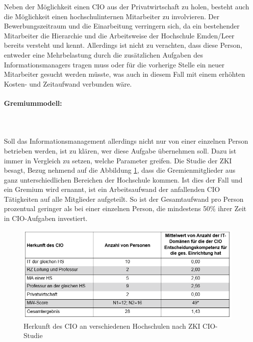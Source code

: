 Neben der Möglichkeit einen CIO aus der Privatwirtschaft zu holen, besteht auch die Möglichkeit einen hochschulinternen Mitarbeiter zu involvieren. Der Bewerbungszeitraum und die Einarbeitung verringern sich, da ein bestehender Mitarbeiter die Hierarchie und die Arbeitsweise der Hochschule Emden/Leer bereits versteht und kennt. Allerdings ist nicht zu verachten, dass diese Person, entweder eine Mehrbelastung durch die zusätzlichen Aufgaben des Informationsmanagers tragen muss oder für die vorherige Stelle ein neuer Mitarbeiter gesucht werden müsste, was auch in diesem Fall mit einem erhöhten Kosten- und Zeitaufwand verbunden wäre.
\newpage
\paragraph*{Gremiummodell:}\mbox{}\\\\
Soll das Informationsmanagement allerdings nicht nur von einer einzelnen Person betrieben werden, ist zu klären, wer diese Aufgabe übernehmen soll. Dazu ist immer in Vergleich zu setzen, welche Parameter greifen. Die Studie der ZKI besagt, Bezug nehmend auf die Abbildung \ref{fig_herkunft_cio_hochschulen}, dass die Gremienmitglieder aus ganz unterschiedlichen Bereichen der Hochschule kommen. Ist dies der Fall und ein Gremium wird ernannt, ist ein Arbeitsaufwand der anfallenden CIO Tätigkeiten auf alle Mitglieder aufgeteilt. So ist der Gesamtaufwand pro Person prozentual geringer als bei einer einzelnen Person, die mindestens 50\% ihrer Zeit in CIO-Aufgaben investiert.

\begin{figure}[h!]
	\centering
	\includegraphics[width=\textwidth]
	{kapitel/gruppe3/bilder/herkunft_cio_hochschulen}
	\caption{Herkunft des CIO an verschiedenen Hochschulen nach ZKI CIO-Studie\protect\footnotemark}
	\label{fig_herkunft_cio_hochschulen}
\end{figure}

